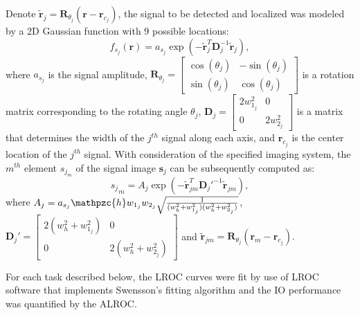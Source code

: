 \documentclass[journal]{IEEEtran}
\renewcommand{\vec}[1]{\mathbf{#1}}
\begin{document}
{Denote $\tilde{\vec{r}}_j=\mathbf{R}_{\theta_j} (\vec{r}-\vec{r}_{c_j})$,}
the signal to be detected and localized was modeled by a 2D Gaussian function with 9 possible locations:
\begin{equation}
\label{eq:signal}
{f_{s_j}(\vec{r}) = {a_{s_j}}\exp\left(- \tilde{\vec{r}}_j^T\mathbf{D}_j^{-1} \tilde{\vec{r}}_j \right),}
\end{equation}
where $a_{s_j}$ is the signal amplitude, 
$\vec{R}_{\theta_j}= \begin{bmatrix}
       \cos(\theta_j) & -\sin(\theta_j)           \\[0.3em]
       \sin(\theta_j) & \cos(\theta_j)
     \end{bmatrix}$
is {a rotation matrix} corresponding to the rotating angle $\theta_j$,
$\vec{D}_j=
\begin{bmatrix}
2w_{1_j}^2 & 0 \\
0 & 2w_{2_j}^2 
\end{bmatrix}
$  is a matrix that determines the width of the $j^{th}$ signal along each axis,
and $\vec{r}_{c_j}$ is the center location of the $j^{th}$ signal.
With consideration of the specified imaging system, the $m^{th}$ element ${s}_{j_m}$ of the signal image ${\vec{s}_j}$ can be subsequently computed as:
 \begin{equation}
{ {s_j}_m  =  A_j  \exp{\left({-\tilde{\vec{r}}_{jm}^{T}\vec{D}_j'^{-1}\tilde{\vec{r}}_{jm}}\right)},}
 \end{equation} 
where $A_j = {a_{s_j}\mathpzc{h}w_{1_j} w_{2_j}} \sqrt{\frac{1}{(w_h^2+w_{1_j}^2)(w_h^2+w_{2_j}^2)}}$, $\vec{D}_j'= \begin{bmatrix}
2(w_h^2+w_{1_j}^2) & 0 \\
0 & 2(w_h^2+w_{2_j}^2) 
\end{bmatrix}$
and {$\tilde{\vec{r}}_{jm}=\mathbf{R}_{\theta_j} (\vec{r}_m-\vec{r}_{c_j})$.}

For each task described below,  the LROC curves were fit by use of LROC software \cite{Judy2010LROC} that implements Swensson's fitting algorithm\cite{swensson1996unified} and the IO performance was quantified by the
ALROC. 

\vspace{0.4cm}
\end{document}
